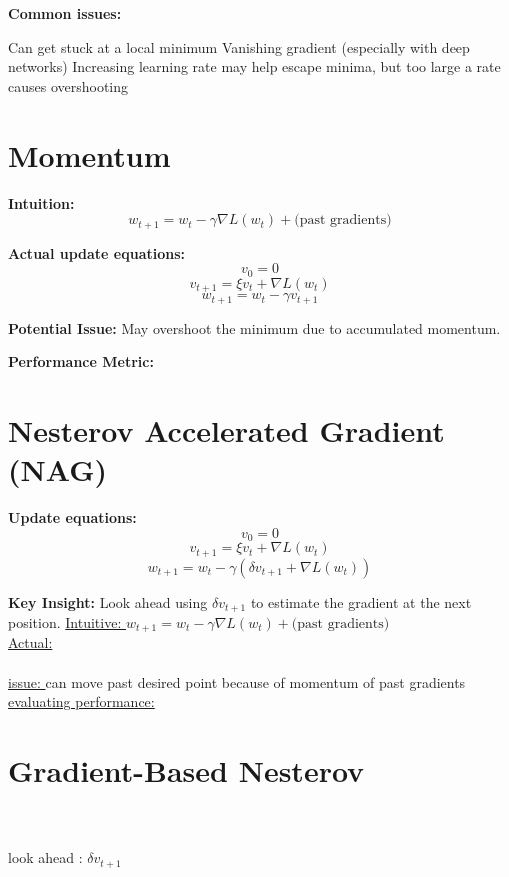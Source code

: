 \vspace{1em}
\textbf{Common issues:}
\begin{outline}
    \1 Can get stuck at a local minimum
    \1 Vanishing gradient (especially with deep networks)
    \1 Increasing learning rate may help escape minima, but too large a rate causes overshooting
\end{outline}

\section{Momentum}


\textbf{Intuition:}
\[
    w_{t+1} = w_t - \gamma \nabla L(w_t) + \text{(past gradients)}
\]

\textbf{Actual update equations:}
\[
    v_0 = 0
\]
\[
    v_{t+1} = \xi v_t + \nabla L(w_t)
\]
\[
    w_{t+1} = w_t - \gamma v_{t+1}
\]

\textbf{Potential Issue:} May overshoot the minimum due to accumulated momentum.

\textbf{Performance Metric:} 

\section{Nesterov Accelerated Gradient (NAG)}

\textbf{Update equations:}
\[
    v_0 = 0
\]
\[
    v_{t+1} = \xi v_t + \nabla L(w_t)
\]
\[
    w_{t+1} = w_t - \gamma (\delta v_{t+1} + \nabla L(w_t))
\]

\textbf{Key Insight:} Look ahead using $\delta v_{t+1}$ to estimate the gradient at the next position.
\underline{Intuitive: } $w_{t+1}=w_t-\gamma \nabla L(w_t) + \text{(past gradients)}$\\
\underline{Actual: }\\ 
\\
\underline{issue: } can move past desired point because of momentum of past gradients\\
\underline{evaluating performance: } \\

\section{Gradient-Based Nesterov}
\\
\\
look ahead : $\delta v_{t+1}$
